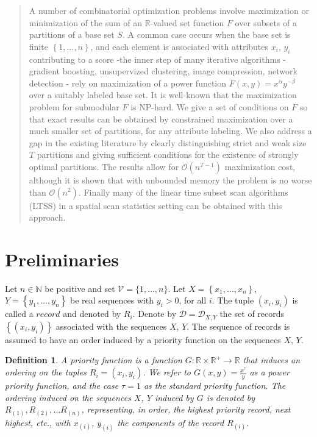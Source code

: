 \documentclass{article}
\newtheorem{definition}{Definition}
\theoremstyle{case}
\begin{document}
\sloppy

\begin{abstract}
	A number of combinatorial optimization problems involve maximization or minimization of the sum of an $\mathbb{R}$-valued set function $F$ over subsets of a partitions of a base set $S$. A common case occurs when the base set is finite $\left\lbrace 1, \dots, n\right\rbrace$, and each element is associated with attributes $x_i$, $y_i$ contributing to a score -the inner step of many iterative algorithms - gradient boosting, unsupervized clustering, image compression, network detection - rely on maximization of a power function $F(x,y) = x^{\alpha}y^{-\beta}$ over a suitably labeled base set. It is well-known that the maximization problem for submodular $F$ is NP-hard. We give a set of conditions on $F$ so that exact results can be obtained by constrained maximization over a much smaller set of partitions, for any attribute labeling. We also address a gap in the existing literature by clearly distinguishing strict and weak size $T$ partitions and giving sufficient conditions for the existence of strongly optimal partitions. The results allow for $\mathcal{O}\left( n^{T-1}\right)$ maximization cost, although it is shown that with unbounded memory the problem is no worse than $\mathcal{O}\left(n^2\right)$. Finally many of the linear time subset scan algorithms (LTSS) in a spatial scan statistics setting can be obtained with this approach.
\end{abstract}

\section{Preliminaries}
Let $n \in \mathbb{N}$ be positive and set $\mathcal{V} = \{1, \dots, n\}$. Let $X = \left\lbrace x_1, \dots, x_n\right\rbrace$, $Y = \left\lbrace y_1, \dots, y_n\right\rbrace$ be real sequences with $y_i > 0$, for all $i$. The tuple $\left(x_i, y_i\right)$ is called a $\textit{record}$ and denoted by $R_i$. Denote by $\mathcal{D} = \mathcal{D}_{X,Y}$ the set of records $\left\lbrace \left( x_i, y_i\right) \right\rbrace$ associated with the sequences $X$, $Y$. The sequence of records is assumed to have an order induced by a priority function on the sequences $X$, $Y$.

\begin{definition}
A priority function is a function $G\colon \mathbb{R} \times \mathbb{R}^{+} \to \mathbb{R}$ that induces an ordering on the tuples $R_i = \left(x_i, y_i\right)$. We refer to $G(x,y) = \frac{x^{\tau}}{y}$ as a power priority function, and the case $\tau = 1$ as the standard priority function. The ordering induced on the sequences $X$, $Y$ induced by $G$ is denoted by $R_{(1)}, R_{(2)}, \dots R_{(n)}$, representing, in order, the highest priority record, next highest, etc., with $x_{\left( i\right)}$, $y_{\left( i\right)}$ the components of the record $R_{\left( i\right)}$.
\end{definition}
\end{document}
